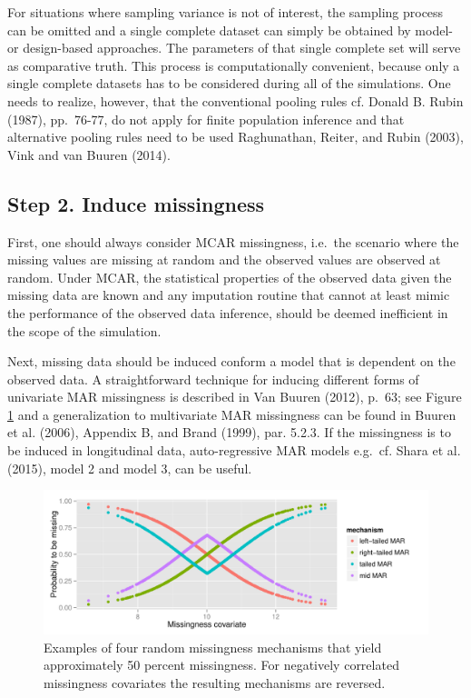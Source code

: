 \documentclass[
]{article}
\begin{document}
For situations where sampling variance is not of interest, the sampling
process can be omitted and a single complete dataset can simply be
obtained by model- or design-based approaches. The parameters of that
single complete set will serve as comparative truth. This process is
computationally convenient, because only a single complete datasets has
to be considered during all of the simulations. One needs to realize,
however, that the conventional pooling rules cf. Donald B. Rubin (1987),
pp.~76-77, do not apply for finite population inference and that
alternative pooling rules need to be used Raghunathan, Reiter, and Rubin
(2003), Vink and van Buuren (2014).

\hypertarget{step-2.-induce-missingness}{%
\subsection{Step 2. Induce
missingness}\label{step-2.-induce-missingness}}

First, one should always consider MCAR missingness, i.e.~the scenario
where the missing values are missing at random and the observed values
are observed at random. Under MCAR, the statistical properties of the
observed data given the missing data are known and any imputation
routine that cannot at least mimic the performance of the observed data
inference, should be deemed inefficient in the scope of the simulation.

Next, missing data should be induced conform a model that is dependent
on the observed data. A straightforward technique for inducing different
forms of univariate MAR missingness is described in Van Buuren (2012),
p.~63; see Figure \ref{fig:MAR} and a generalization to multivariate MAR
missingness can be found in Buuren et al. (2006), Appendix B, and Brand
(1999), par. 5.2.3. If the missingness is to be induced in longitudinal
data, auto-regressive MAR models e.g.~cf. Shara et al. (2015), model 2
and model 3, can be useful.

\begin{figure}
\centering
\includegraphics{img/plot_mar.pdf}
\caption{\label{fig:MAR}Examples of four random missingness mechanisms
that yield approximately 50 percent missingness. For negatively
correlated missingness covariates the resulting mechanisms are
reversed.}
\end{figure}
\end{document}
